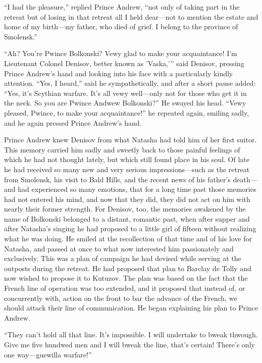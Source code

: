 ``I had the pleasure,'' replied Prince Andrew, ``not only of
taking part in the retreat but of losing in that retreat all I
held dear---not to mention the estate and home of my birth---my
father, who died of grief. I belong to the province of
Smolensk.''

``Ah? You're Pwince Bolkonski? Vewy glad to make your
acquaintance! I'm Lieutenant Colonel Denisov, better known as
'Vaska,'{}'' said Denisov, pressing Prince Andrew's hand and
looking into his face with a particularly kindly
attention. ``Yes, I heard,'' said he sympathetically, and after a
short pause added: ``Yes, it's Scythian warfare. It's all vewy
well---only not for those who get it in the neck. So you are
Pwince Andwew Bolkonski?'' He swayed his head. ``Vewy pleased,
Pwince, to make your acquaintance!'' he repeated again, smiling
sadly, and he again pressed Prince Andrew's hand.

Prince Andrew knew Denisov from what Natasha had told him of her
first suitor. This memory carried him sadly and sweetly back to
those painful feelings of which he had not thought lately, but
which still found place in his soul. Of late he had received so
many new and very serious impressions---such as the retreat from
Smolensk, his visit to Bald Hills, and the recent news of his
father's death---and had experienced so many emotions, that for a
long time past those memories had not entered his mind, and now
that they did, they did not act on him with nearly their former
strength. For Denisov, too, the memories awakened by the name of
Bolkonski belonged to a distant, romantic past, when after supper
and after Natasha's singing he had proposed to a little girl of
fifteen without realizing what he was doing. He smiled at the
recollection of that time and of his love for Natasha, and passed
at once to what now interested him passionately and
exclusively. This was a plan of campaign he had devised while
serving at the outposts during the retreat. He had proposed that
plan to Barclay de Tolly and now wished to propose it to
Kutuzov. The plan was based on the fact that the French line of
operation was too extended, and it proposed that instead of, or
concurrently with, action on the front to bar the advance of the
French, we should attack their line of communication. He began
explaining his plan to Prince Andrew.

``They can't hold all that line. It's impossible. I will
undertake to bweak thwough. Give me five hundwed men and I will
bweak the line, that's certain! There's only one way---guewilla
warfare!''

